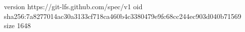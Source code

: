 version https://git-lfs.github.com/spec/v1
oid sha256:7a8277014ac30a3133cf718ca460b4c3380479e9fc68cc244ec903d040b71569
size 1648
